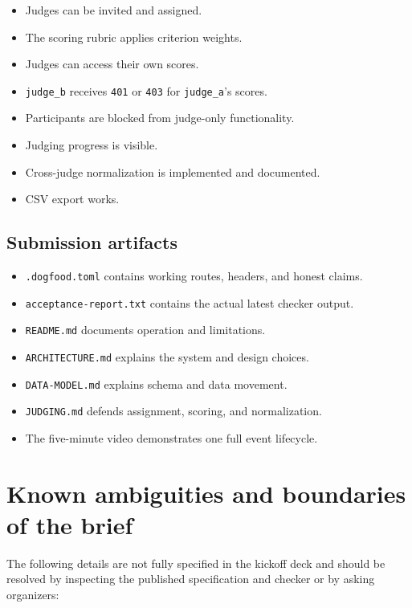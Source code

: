 \documentclass[11pt]{article}
\newcommand{\checkbox}{\textcolor{DeepBlue}{\ding{113}}}
\begin{document}
\begin{itemize}
  \item[\checkbox] Judges can be invited and assigned.
  \item[\checkbox] The scoring rubric applies criterion weights.
  \item[\checkbox] Judges can access their own scores.
  \item[\checkbox] \texttt{judge\_b} receives \texttt{401} or \texttt{403} for \texttt{judge\_a}'s scores.
  \item[\checkbox] Participants are blocked from judge-only functionality.
  \item[\checkbox] Judging progress is visible.
  \item[\checkbox] Cross-judge normalization is implemented and documented.
  \item[\checkbox] CSV export works.
\end{itemize}

\subsection{Submission artifacts}

\begin{itemize}
  \item[\checkbox] \texttt{.dogfood.toml} contains working routes, headers, and honest claims.
  \item[\checkbox] \texttt{acceptance-report.txt} contains the actual latest checker output.
  \item[\checkbox] \texttt{README.md} documents operation and limitations.
  \item[\checkbox] \texttt{ARCHITECTURE.md} explains the system and design choices.
  \item[\checkbox] \texttt{DATA-MODEL.md} explains schema and data movement.
  \item[\checkbox] \texttt{JUDGING.md} defends assignment, scoring, and normalization.
  \item[\checkbox] The five-minute video demonstrates one full event lifecycle.
\end{itemize}

\section{Known ambiguities and boundaries of the brief}

The following details are not fully specified in the kickoff deck and should be resolved by inspecting the published specification and checker or by asking organizers:
\end{document}
